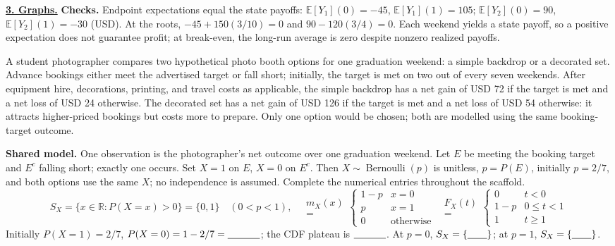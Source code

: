 \textbf{\underline{3. Graphs.}}
\textbf{Checks.} Endpoint expectations equal the state payoffs:
$\mathbb E[Y_1](0)=-45$, $\mathbb E[Y_1](1)=105$;
$\mathbb E[Y_2](0)=90$, $\mathbb E[Y_2](1)=-30$ (USD).
At the roots, $-45+150(3/10)=0$ and $90-120(3/4)=0$.
Each weekend yields a state payoff, so a positive expectation does not guarantee profit;
at break-even, the long-run average is zero despite nonzero realized payoffs.

\vspace{-6mm}
A student photographer compares two hypothetical photo booth options for one graduation
weekend: a simple backdrop or a decorated set. Advance bookings either meet the advertised
target or fall short; initially, the target is met on two out of every seven weekends.
After equipment hire, decorations, printing, and travel costs as applicable, the simple
backdrop has a net gain of USD 72 if the target is met and a net loss of USD 24 otherwise.
The decorated set has a net gain of USD 126 if the target is met and a net loss of USD 54
otherwise: it attracts higher-priced bookings but costs more to prepare. Only one option
would be chosen; both are modelled using the same booking-target outcome.

\textbf{Shared model.} One observation is the photographer's net outcome over one graduation weekend.
Let $E$ be meeting the booking target and $E^c$ falling short; exactly one occurs.
Set $X=1$ on $E$, $X=0$ on $E^c$. Then $X\sim\operatorname{Bernoulli}(p)$ is unitless,
$p=P(E)$, initially $p=2/7$, and both options use the same $X$; no independence is assumed.
Complete the numerical entries throughout the scaffold.
\[
S_X=\{x\in\mathbb R:P(X=x)>0\}=\{0,1\}\quad(0<p<1),\quad
\begin{gathered}
m_X(x)\\
=
\end{gathered}
\begin{cases}1-p&x=0\\p&x=1\\0&\text{otherwise}\end{cases}
\enspace
\begin{gathered}
F_X(t)\\
=
\end{gathered}
\begin{cases}0&t<0\\1-p&0\leq t<1\\1&t\geq1\end{cases}
\]
Initially $P(X=1)=2/7$, $P(X=0)=1-2/7=\underline{\hspace{1.15cm}}$;
the CDF plateau is $\underline{\hspace{1.15cm}}$.
At $p=0$, $S_X=\{\underline{\hspace{.7cm}}\}$; at $p=1$, $S_X=\{\underline{\hspace{.7cm}}\}$.

